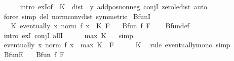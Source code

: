 \begin{isabellebody}
\ \ \ \ \isamarkupfalse%
\ {\isacharparenleft}{\kern0pt}intro\ exI{\isacharbrackleft}{\kern0pt}of\ {\isacharunderscore}{\kern0pt}\ {\isachardoublequoteopen}K\ {\isacharplus}{\kern0pt}\ dist\ {}\ y{\isachardoublequoteclose}{\isacharbrackright}{\kern0pt}\ add{\isacharunderscore}{\kern0pt}pos{\isacharunderscore}{\kern0pt}nonneg\ conjI\ zero{\isacharunderscore}{\kern0pt}le{\isacharunderscore}{\kern0pt}dist{\isacharparenright}{\kern0pt}\ auto\isanewline
{}\isamarkupfalse%
\ {\isacharparenleft}{\kern0pt}force\ simp\ del{\isacharcolon}{\kern0pt}\ norm{\isacharunderscore}{\kern0pt}conv{\isacharunderscore}{\kern0pt}dist\ {\isacharbrackleft}{\kern0pt}symmetric{\isacharbrackright}{\kern0pt}{\isacharparenright}{\kern0pt}%
\endisatagproof
{\isafoldproof}%
%
\isadelimproof
\isanewline
%
\endisadelimproof
\isanewline
{}\isamarkupfalse%
\ BfunI{\isacharcolon}{\kern0pt}\isanewline
\ \ \ K{\isacharcolon}{\kern0pt}\ {\isachardoublequoteopen}eventually\ {\isacharparenleft}{\kern0pt}{\isasymlambda}x{\isachardot}{\kern0pt}\ norm\ {\isacharparenleft}{\kern0pt}f\ x{\isacharparenright}{\kern0pt}\ {\isasymle}\ K{\isacharparenright}{\kern0pt}\ F{\isachardoublequoteclose}\isanewline
\ \ \ {\isachardoublequoteopen}Bfun\ f\ F{\isachardoublequoteclose}\isanewline
%
\isadelimproof
\ \ %
\endisadelimproof
%
\isatagproof
{}\isamarkupfalse%
\ Bfun{\isacharunderscore}{\kern0pt}def\isanewline
{}\isamarkupfalse%
\ {\isacharparenleft}{\kern0pt}intro\ exI\ conjI\ allI{\isacharparenright}{\kern0pt}\isanewline
\ \ \isamarkupfalse%
\ {\isachardoublequoteopen}{}\ {\isacharless}{\kern0pt}\ max\ K\ {}{\isachardoublequoteclose}\ \isamarkupfalse%
\ simp\isanewline
\ \ \isamarkupfalse%
\ {\isachardoublequoteopen}eventually\ {\isacharparenleft}{\kern0pt}{\isasymlambda}x{\isachardot}{\kern0pt}\ norm\ {\isacharparenleft}{\kern0pt}f\ x{\isacharparenright}{\kern0pt}\ {\isasymle}\ max\ K\ {}{\isacharparenright}{\kern0pt}\ F{\isachardoublequoteclose}\isanewline
\ \ \ \ \isamarkupfalse%
\ K\ \isamarkupfalse%
\ {\isacharparenleft}{\kern0pt}rule\ eventually{\isacharunderscore}{\kern0pt}mono{\isacharparenright}{\kern0pt}\ simp\isanewline
{}\isamarkupfalse%
%
\endisatagproof
{\isafoldproof}%
%
\isadelimproof
\isanewline
%
\endisadelimproof
\isanewline
{}\isamarkupfalse%
\ BfunE{\isacharcolon}{\kern0pt}\isanewline
\ \ \ {\isachardoublequoteopen}Bfun\ f\ F{\isachardoublequoteclose}\isanewline

\end{isabellebody}
